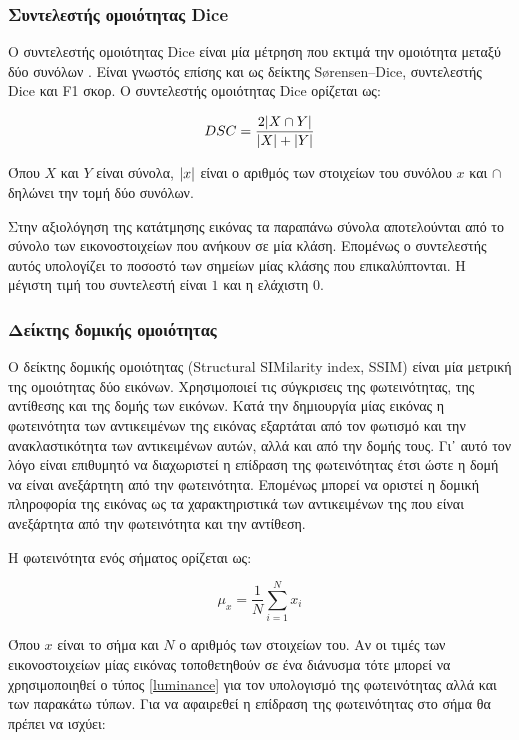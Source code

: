 \documentclass[a4paper,12pt]{article}
\DeclarePairedDelimiter\abs{\lvert}{\rvert}
\begin{document}
\subsubsection{Συντελεστής ομοιότητας Dice} \label{Dice:1}

Ο συντελεστής ομοιότητας Dice είναι μία μέτρηση που εκτιμά την ομοιότητα μεταξύ
δύο συνόλων \cite{dice:1}. Είναι γνωστός επίσης και ως δείκτης Sørensen–Dice,
συντελεστής Dice και F1 σκορ. Ο συντελεστής ομοιότητας Dice ορίζεται ως:

\begin{equation} \label{eq:Dice:1}
    DSC = \frac{2 \abs{X \cap Y}} {\abs{X} + \abs{Y}}
\end{equation}

Όπου $X$ και $Y$ είναι σύνολα, $\abs{x}$ είναι ο αριθμός των στοιχείων του
συνόλου $x$ και $\cap$ δηλώνει την τομή δύο συνόλων.

Στην αξιολόγηση της κατάτμησης εικόνας τα παραπάνω σύνολα αποτελούνται από το
σύνολο των εικονοστοιχείων που ανήκουν σε μία κλάση. Επομένως ο συντελεστής
αυτός υπολογίζει το ποσοστό των σημείων μίας κλάσης που επικαλύπτονται. Η
μέγιστη τιμή του συντελεστή είναι $1$ και η ελάχιστη $0$.

\subsubsection{Δείκτης δομικής ομοιότητας} \label{SSIM:1}

Ο δείκτης δομικής ομοιότητας \cite{SSIM:1} (Structural SIMilarity index, SSIM)
είναι μία μετρική της ομοιότητας δύο εικόνων. Χρησιμοποιεί τις σύγκρισεις της
φωτεινότητας, της αντίθεσης και της δομής των εικόνων. Κατά την δημιουργία μίας
εικόνας η φωτεινότητα των αντικειμένων της εικόνας εξαρτάται από τον φωτισμό και
την ανακλαστικότητα των αντικειμένων αυτών, αλλά και από την δομής τους. Γι᾽
αυτό τον λόγο είναι επιθυμητό να διαχωριστεί η επίδραση της φωτεινότητας έτσι
ώστε η δομή να είναι ανεξάρτητη από την φωτεινότητα. Επομένως μπορεί να οριστεί
η δομική πληροφορία της εικόνας ως τα χαρακτηριστικά των αντικειμένων της που
είναι ανεξάρτητα από την φωτεινότητα και την αντίθεση.

Η φωτεινότητα ενός σήματος ορίζεται ως:

\begin{equation}\label{luminance}
    \mu_x = \frac {1} {N} \sum_{i=1}^{N} x_i
\end{equation}

Όπου $x$ είναι το σήμα  και $N$ ο αριθμός των στοιχείων του. Αν οι τιμές των
εικονοστοιχείων μίας εικόνας τοποθετηθούν σε ένα διάνυσμα τότε μπορεί να
χρησιμοποιηθεί ο τύπος \eqref{luminance} για τον υπολογισμό της φωτεινότητας
αλλά και των παρακάτω τύπων. Για να αφαιρεθεί η επίδραση της φωτεινότητας στο
σήμα θα πρέπει να ισχύει:
\end{document}
